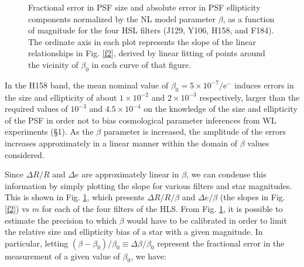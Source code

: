 \documentclass[11pt,preprint,flushrt]{aastex}
\begin{document}
\begin{figure}[!h]
\centering
{}
\caption{Fractional error in PSF size and absolute error in PSF ellipticity components normalized by the NL model parameter $\beta$, as a function of magnitude for the four HSL filters (J129, Y106, H158, and F184). The ordinate axis in each plot represents the slope of the linear relationships in Fig. \ref{f2}, derived by linear fitting of points around the vicinity of $\beta_0$ in each curve of that figure.}
\label{f3}
\end{figure}

In the H158 band, the mean nominal value of $\beta_0=5\times10^{-7}/\mathrm{e^-}$ induces errors in the size and ellipticity of about $1\times10^{-2}$ and $2\times10^{-3}$ respectively, larger than the required values of $10^{-3}$ and $4.5\times10^{-4}$ on the knowledge of the size and ellipticity of the PSF in order not to bias cosmological parameter inferences from WL experiments (\S1). As the $\beta$ parameter is increased, the amplitude of the errors increases approximately in a linear manner within the domain of $\beta$ values considered. 
 
Since $\Delta R/R$ and $\Delta e$ are approximately linear in $\beta$, we can condense this information by simply plotting the slope for various filters and star magnitudes. This is shown in Fig. \ref{f3}, which presents $\Delta R/R/\beta$ and $\Delta e/\beta$ (the slopes in Fig. \ref{f2}) vs $m$ for each of the four filters of the HLS. From Fig. \ref{f3}, it is possible to estimate the precision to which $\beta$ would have to be calibrated in order to limit the relative size and ellipticity bias of a star with a given magnitude. In particular, letting $(\beta - \beta_0)/\beta_0 \equiv \Delta \beta / \beta_0$ represent the fractional error in the measurement of a given value of $\beta_0$, we have: 
\end{document}
